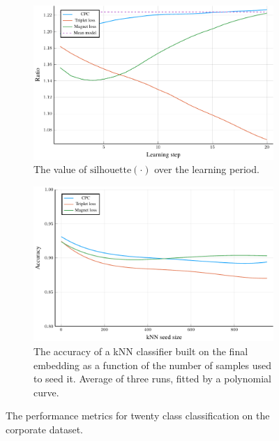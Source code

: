 \begin{figure}[H]
  \centering
  \begin{subfigure}[t]{0.49\textwidth}
    \centering
    \includegraphics[width=\textwidth]{images/cisco-multiclass/ratio/cisco-multiclass-ratio.pdf}
    \caption{The value of \( \mathrm{silhouette} \left( \cdot \right) \) over the learning period.}\label{fig:cisco-multiclass-ratio}
  \end{subfigure}
  \hfill
  \begin{subfigure}[t]{0.49\textwidth}
    \centering
    \includegraphics[width=\textwidth]{images/cisco-multiclass/kNN-poly/cisco-multiclass-kNN-poly.pdf}
    \caption{The accuracy of a kNN classifier built on the final embedding as a function of the number of samples used to seed it. Average of three runs, fitted by a polynomial curve.}\label{fig:cisco-multiclass-kNN-poly}
  \end{subfigure}
  \caption{The performance metrics for twenty class classification on the corporate dataset.}
\end{figure}

